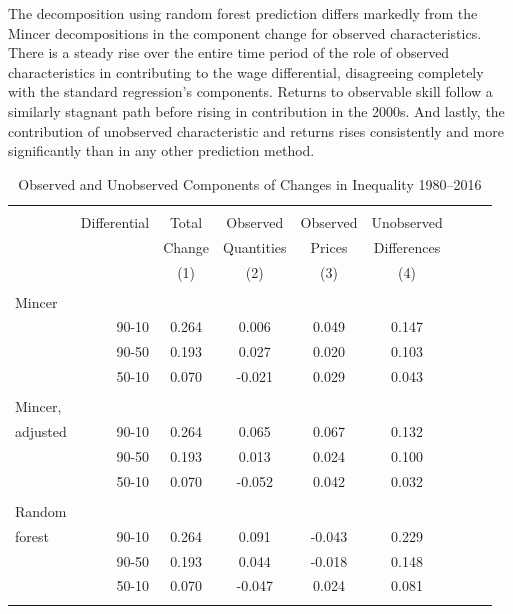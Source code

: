 \documentclass[notitlepage,12pt]{article}
\newcommand{\1}[1]{\ensuremath{\mathbb{1}\left( #1 \right)}}               %
\begin{document}
The decomposition using random forest prediction differs markedly from the Mincer decompositions in the component change for observed characteristics.  There is a steady rise over the entire time period of the role of observed characteristics in contributing to the wage differential, disagreeing completely with the standard regression's components.  Returns to observable skill follow a similarly stagnant path before rising in contribution in the 2000s.  And lastly, the contribution of unobserved characteristic and returns rises consistently and more significantly than in any other prediction method.
\begin{table}[h]
\centering
\caption{Observed and Unobserved Components of Changes in Inequality 1980--2016}
\label{tab:components}
\begin{tabular}{@{\extracolsep{5pt}}lr|ccccccc} 
\\[-1.8ex]\hline 
\hline \\[-1.8ex] 
 & Differential & Total & Observed & Observed & Unobserved  \\
  & & Change & Quantities & Prices & Differences  \\
 & & (1) & (2) & (3) & (4) \\
\hline \hline \\[-1.8ex] 
 Mincer & \\
 & 90-10 &  0.264 & 0.006 & 0.049 &  0.147 \\ 
   & 90-50 &  0.193 & 0.027 & 0.020 &  0.103 \\ 
   & 50-10 &  0.070 &  -0.021 & 0.029 &  0.043 \\
  \\[-1.8ex] \hline
 Mincer, & \\
 adjusted &  90-10 &  0.264 &  0.065 & 0.067 &  0.132 \\ 
   & 90-50 &  0.193 &  0.013 & 0.024 &  0.100 \\ 
   & 50-10 &  0.070 &  -0.052 & 0.042 &  0.032 \\
 \\[-1.8ex] \hline
 Random & \\ 
 forest & 90-10 &  0.264 &  0.091 & -0.043 &  0.229 \\ 
  & 90-50 &  0.193 &  0.044 & -0.018 &  0.148 \\ 
  & 50-10 &  0.070 &  -0.047 & 0.024 &  0.081 \\
\hline 
\hline  \\[-1.8ex] 
\end{tabular} 
\end{table}
\end{document}
